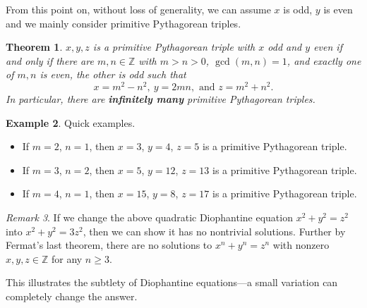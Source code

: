 \documentclass{amsbook}
\theoremstyle{plain}
\newtheorem{theorem}{Theorem}[chapter] %
\theoremstyle{definition}
\newtheorem{example}[theorem]{Example}
\theoremstyle{remark}
\newtheorem{remark}[theorem]{Remark}
\numberwithin{equation}{chapter}
\numberwithin{figure}{chapter}
\newcommand{\Z}{\mathbb{Z}}
\begin{document}
From this point on, without loss of generality, we can assume $x$ is odd, $y$ is even and we mainly consider primitive Pythagorean triples.
\begin{theorem}\label{thm:pythagorean_prim_triple}
  $x, y, z$ is a primitive Pythagorean triple with $x$ odd and $y$ even if and only if there are $m, n \in \Z$ with $m > n > 0$, $\gcd (m, n) = 1$, and exactly one of $m, n$ is even, the other is odd such that 
\[
x = m^2 - n^2, ~y = 2mn, \text{ and } z = m^2 + n^2.
\]
In particular, there are \textbf{infinitely many} primitive Pythagorean triples. 
\end{theorem}
\begin{example}
  Quick examples.
  \begin{itemize}
  \item If $m = 2$, $n = 1$, then $x = 3$, $y = 4$, $z = 5$ is a primitive Pythagorean triple.
  \item If $m = 3$, $n = 2$, then $x = 5$, $y = 12$, $z = 13$ is a primitive Pythagorean triple.
  \item If $m = 4$, $n = 1$, then $x = 15$, $y = 8$, $z = 17$ is a primitive Pythagorean triple.
  \end{itemize}
\end{example}
\begin{remark}
  If we change the above quadratic Diophantine equation $x^2 + y^2 = z^2$ into $x^2 + y^2 = 3 z^2$, then we can show it has no nontrivial solutions. Further by Fermat's last theorem, there are no solutions to $x^n + y^n = z^n$ with nonzero $x, y, z \in \Z$ for any $n \geqslant 3$.

  This illustrates the subtlety of Diophantine equations---a small variation can completely change the answer. 
\end{remark}
\end{document}
